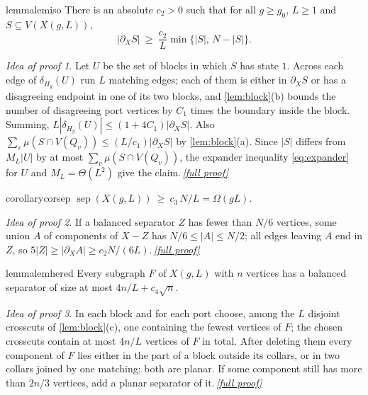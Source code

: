 \documentclass[11pt,a4paper]{article}
\theoremstyle{plain}
\theoremstyle{definition}
\theoremstyle{remark}
\newtheorem*{proofidea}{Idea of proof}
\newcommand{\fullproofref}[1]{\,\hyperref[#1]{\textit{[full proof]}}}
\newcommand{\sep}{\operatorname{sep}}
\begin{document}
\begin{restatable}[Isoperimetry of $X$]{lemma}{lemiso}\label{lem:iso}
There is an absolute $c_2>0$ such that for all $g\ge g_0$, $L\ge1$ and $S\subseteq V(X(g,L))$,
\[
 |\partial_X S|\ \ge\ \frac{c_2}{L}\min\{|S|,\,N-|S|\}.
\]
\end{restatable}
\begin{proofidea}
Let $U$ be the set of blocks in which $S$ has state $1$. Across each edge of $\delta_{H_g}(U)$ run $L$ matching edges; each of them is either in $\partial_XS$ or has a disagreeing endpoint in one of its two blocks, and \cref{lem:block}(b) bounds the number of disagreeing port vertices by $C_1$ times the boundary inside the block. Summing, $L|\delta_{H_g}(U)|\le(1+4C_1)|\partial_XS|$. Also $\sum_v\mu(S\cap V(Q_v))\le (L/c_1)|\partial_XS|$ by \cref{lem:block}(a). Since $|S|$ differs from $M_L|U|$ by at most $\sum_v\mu(S\cap V(Q_v))$, the expander inequality \eqref{eq:expander} for $U$ and $M_L=\Theta(L^2)$ give the claim.\fullproofref{pf:iso}
\end{proofidea}

\begin{restatable}{corollary}{corsep}\label{cor:sep}
$\sep(X(g,L))\ \ge\ c_3\,N/L=\Omega(gL)$.
\end{restatable}
\begin{proofidea}
If a balanced separator $Z$ has fewer than $N/6$ vertices, some union $A$ of components of $X-Z$ has $N/6\le|A|\le N/2$; all edges leaving $A$ end in $Z$, so $5|Z|\ge|\partial_XA|\ge c_2N/(6L)$.\fullproofref{pf:sep}
\end{proofidea}

\begin{restatable}{lemma}{lemhered}\label{lem:hered}
Every subgraph $F$ of $X(g,L)$ with $n$ vertices has a balanced separator of size at most $4n/L+c_4\sqrt n$.
\end{restatable}
\begin{proofidea}
In each block and for each port choose, among the $L$ disjoint crosscuts of \cref{lem:block}(c), one containing the fewest vertices of $F$; the chosen crosscuts contain at most $4n/L$ vertices of $F$ in total. After deleting them every component of $F$ lies either in the part of a block outside its collars, or in two collars joined by one matching; both are planar. If some component still has more than $2n/3$ vertices, add a planar separator of it.\fullproofref{pf:hered}
\end{proofidea}
\end{document}
